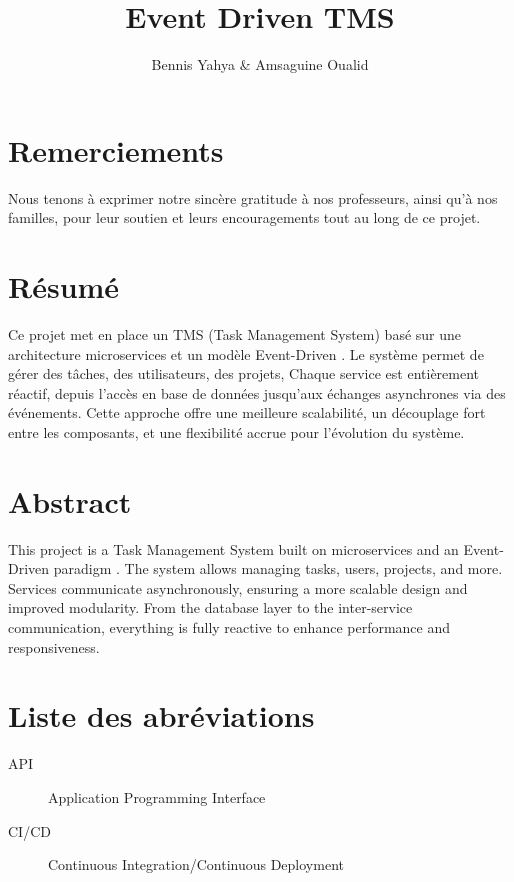\documentclass[12pt,a4paper]{report}
\begin{document}
\title{\textbf{Event Driven TMS}} %
\author{Bennis Yahya & Amsaguine Oualid}
\date{}
\maketitle

\chapter*{Remerciements}
Nous tenons à exprimer notre sincère gratitude à nos professeurs, ainsi qu'à nos familles, pour leur soutien et leurs encouragements tout au long de ce projet.


\chapter*{Résumé}
Ce projet met en place un TMS (Task Management System) basé sur une architecture microservices et un modèle Event-Driven . Le système permet de gérer des tâches, des utilisateurs, des projets, Chaque service est entièrement réactif, depuis l’accès en base de données jusqu’aux échanges asynchrones via des événements. Cette approche offre une meilleure scalabilité, un découplage fort entre les composants, et une flexibilité accrue pour l’évolution du système.


\chapter*{Abstract}
This project is a Task Management System built on microservices and an Event-Driven paradigm . The system allows managing tasks, users, projects, and more. Services communicate asynchronously, ensuring a more scalable design and improved modularity. From the database layer to the inter-service communication, everything is fully reactive to enhance performance and responsiveness.


\chapter*{Liste des abréviations}
\begin{description}
    \item[API] Application Programming Interface
    \item[CI/CD] Continuous Integration/Continuous Deployment
\end{description}
\end{document}
